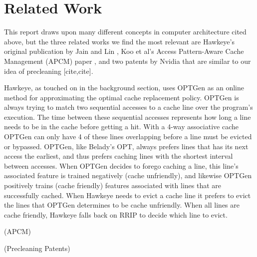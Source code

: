 \chapter{Related Work}

This report draws upon many different concepts in computer architecture cited above, but the three related works we find the most relevant are Hawkeye’s original publication by Jain and Lin \cite{hawkeye}, Koo et al’s Access Pattern-Aware Cache Management (APCM) paper \cite{apcm}, and two patents by Nvidia that are similar to our idea of precleaning [cite,cite].

Hawkeye, as touched on in the background section, uses OPTGen as an online method for approximating the optimal cache replacement policy. OPTGen is always trying to match two sequential accesses to a cache line over the program's execution. The time between these sequential accesses represents how long a line needs to be in the cache before getting a hit. With a 4-way associative cache OPTGen can only have 4 of these lines overlapping before a line must be evicted or bypassed. OPTGen, like Belady’s OPT, always prefers lines that has its next access the earliest, and thus prefers caching lines with the shortest interval between accesses. When OPTGen decides to forego caching a line, this line’s associated feature is trained negatively (cache unfriendly), and likewise OPTGen positively trains (cache friendly) features associated with lines that are successfully cached. When Hawkeye needs to evict a cache line it prefers to evict the lines that OPTGen determines to be cache unfriendly. When all lines are cache friendly, Hawkeye falls back on RRIP \cite{rrip} to decide which line to evict.

(APCM)

(Precleaning Patents)
